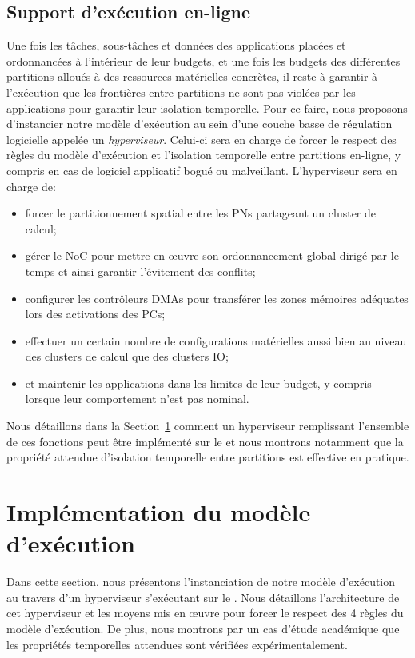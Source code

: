 \documentclass[main.tex]{subfiles}
\begin{document}
\subsection{Support d'exécution en-ligne}
Une fois les tâches, sous-tâches et données des applications placées et ordonnancées à l'intérieur de leur budgets, et une fois les budgets des différentes partitions alloués à des ressources matérielles concrètes, il reste à garantir à l'exécution que les frontières entre partitions ne sont pas violées par les applications pour garantir leur isolation temporelle. Pour ce faire, nous proposons d'instancier notre modèle d'exécution au sein d'une couche basse de régulation logicielle appelée un \emph{hyperviseur}. Celui-ci sera en charge de forcer le respect des règles du modèle d'exécution et l'isolation temporelle entre partitions en-ligne, y compris en cas de logiciel applicatif bogué ou malveillant. L'hyperviseur sera en charge de:
\begin{itemize}
    \item forcer le partitionnement spatial entre les PNs partageant un cluster de calcul;
    \item gérer le NoC pour mettre en œuvre son ordonnancement global dirigé par le temps et ainsi garantir l'évitement des conflits;
    \item configurer les contrôleurs DMAs pour transférer les zones mémoires adéquates lors des activations des PCs;
    \item effectuer un certain nombre de configurations matérielles aussi bien au niveau des clusters de calcul que des clusters IO;
    \item et maintenir les applications dans les limites de leur budget, y compris lorsque leur comportement n'est pas nominal.
\end{itemize}
Nous détaillons dans la Section~\ref{sec_resumeFr_hv} comment un hyperviseur remplissant l'ensemble de ces fonctions peut être implémenté sur le \mppalong et nous montrons notamment que la propriété attendue d'isolation temporelle entre partitions est effective en pratique.





\section{Implémentation du modèle d'exécution}
\label{sec_resumeFr_hv}
Dans cette section, nous présentons l'instanciation de notre modèle d'exécution au travers d'un hyperviseur s'exécutant sur le \mppalong. Nous détaillons l'architecture de cet hyperviseur et les moyens mis en œuvre pour forcer le respect des 4 règles du modèle d'exécution. De plus, nous montrons par un cas d'étude académique que les propriétés temporelles attendues sont vérifiées expérimentalement.
\end{document}
